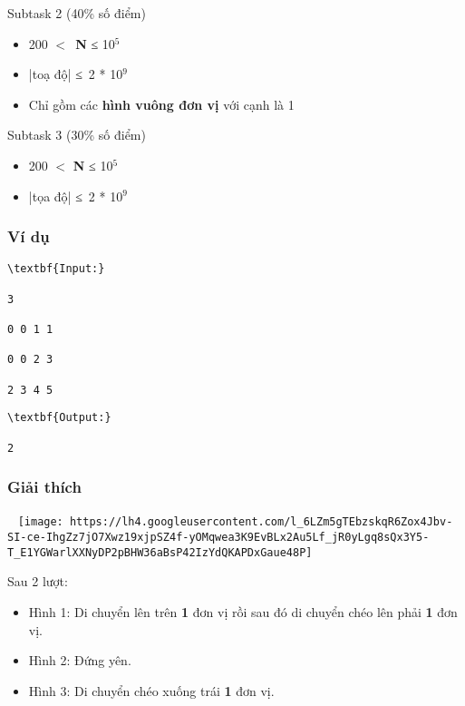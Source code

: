 Subtask 2 (40\% số điểm)
\begin{itemize}
	\item 200 $<$ \textbf{N} ≤ 10$^5$
	\item |toạ độ| ≤ 2 * 10$^9$
	\item Chỉ gồm các \textbf{hình vuông đơn vị} với cạnh là 1
\end{itemize}

Subtask 3 (30\% số điểm)
\begin{itemize}
	\item 200 $<$ \textbf{N} ≤ 10$^5$
	\item |tọa độ| ≤ 2 * 10$^9$
\end{itemize}

\subsubsection{Ví dụ}
\begin{verbatim}
\textbf{Input:}

3

0 0 1 1

0 0 2 3

2 3 4 5\end{verbatim}
\begin{verbatim}
\textbf{Output:}

2\end{verbatim}

\subsubsection{Giải thích}

 
\texttt{[image: https://lh4.googleusercontent.com/l\_6LZm5gTEbzskqR6Zox4Jbv-SI-ce-IhgZz7jO7Xwz19xjpSZ4f-yOMqwea3K9EvBLx2Au5Lf\_jR0yLgq8sQx3Y5-T\_E1YGWarlXXNyDP2pBHW36aBsP42IzYdQKAPDxGaue48P]}

Sau 2 lượt:
\begin{itemize}
	\item Hình 1: Di chuyển lên trên \textbf{1} đơn vị rồi sau đó di chuyển chéo lên phải \textbf{1} đơn vị.
	\item Hình 2: Đứng yên.
	\item Hình 3: Di chuyển chéo xuống trái \textbf{1} đơn vị.
\end{itemize}